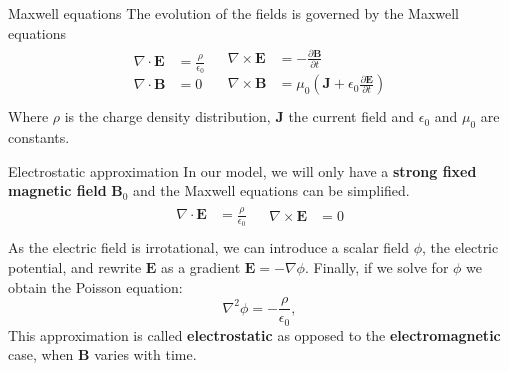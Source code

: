\documentclass{beamer}
\newcommand*\V[1]{\bm{#1}}
\newcommand{\E}{\V{E}}
\newcommand{\B}{\V{B}}
\begin{document}
\begin{frame}{Maxwell equations}{}
The evolution of the fields is governed by the Maxwell equations
\small
\begin{align}%
\begin{split}
\nabla \cdot \E &= \frac {\rho }{\epsilon_0} \\
\nabla \cdot \B &= 0 \\
\end{split}
&
\begin{split}
\nabla \times \E &= - \frac {\partial \B }{\partial t} \\
\nabla \times \B &= \mu_0 \left(\V J +
	\epsilon_0 \frac{\partial \E}{\partial t}\right) \\
\end{split}
\end{align}%
%
\normalsize
Where $\rho$ is the charge density distribution, $\V J$ the current field and
$\epsilon_0$ and $\mu_0$ are constants.

\end{frame}


\begin{frame}{Electrostatic approximation}{}
In our model, we will only have a \textbf{strong fixed magnetic field} $\B_0$ 
and the Maxwell equations can be simplified.
\small
\begin{align}%
\begin{split}
\nabla \cdot \E &= \frac {\rho }{\epsilon_0} \\
\end{split}
&
\begin{split}
\nabla \times \E &= 0 \\
\end{split}
\end{align}%
\normalsize
\pause
As the electric field is irrotational, we can introduce a scalar field $\phi$, 
the electric potential, and rewrite $\E$ as a gradient $\E = - \nabla \phi$.  
Finally, if we solve for $\phi$ we obtain the Poisson equation:
\begin{equation}%
\nabla^2 \phi = - \frac{\rho}{\epsilon_0},
\end{equation}%
This approximation is called \textbf{electrostatic} as opposed to the 
\textbf{electromagnetic} case, when $\B$ varies with time.
\end{frame}

\end{document}
